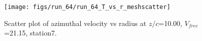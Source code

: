 \begin{figure}[H]
\centering
\texttt{[image: figs/run\_64/run\_64\_T\_vs\_r\_meshscatter]}
\caption{Scatter plot of azimuthal velocity vs radius at $z/c$=10.00, $V_{free}$=21.15, station7.}
\label{fig:run_64_T_vs_r_meshscatter}
\end{figure}


